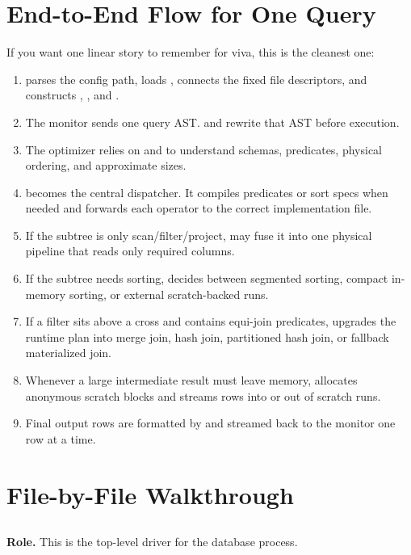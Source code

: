 \documentclass[11pt]{article}
\newcommand{\filetitle}[1]{\subsection{\texorpdfstring{\path{#1}}{#1}}}
\begin{document}
\section{End-to-End Flow for One Query}
If you want one linear story to remember for viva, this is the cleanest one:

\begin{enumerate}[leftmargin=*]
    \item {} parses the config path, loads , connects the fixed file descriptors, and constructs , , and .
    \item The monitor sends one query AST.  and  rewrite that AST before execution.
    \item The optimizer relies on  and  to understand schemas, predicates, physical ordering, and approximate sizes.
    \item {} becomes the central dispatcher. It compiles predicates or sort specs when needed and forwards each operator to the correct implementation file.
    \item If the subtree is only scan/filter/project,  may fuse it into one physical pipeline that reads only required columns.
    \item If the subtree needs sorting,  decides between segmented sorting, compact in-memory sorting, or external scratch-backed runs.
    \item If a filter sits above a cross and contains equi-join predicates,  upgrades the runtime plan into merge join, hash join, partitioned hash join, or fallback materialized join.
    \item Whenever a large intermediate result must leave memory,  allocates anonymous scratch blocks and streams rows into or out of scratch runs.
    \item Final output rows are formatted by  and streamed back to the monitor one row at a time.
\end{enumerate}

\section{File-by-File Walkthrough}

\filetitle{database/src/main.rs}
\textbf{Role.} This is the top-level driver for the database process.
\end{document}
